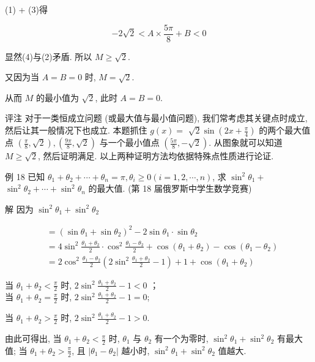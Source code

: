 	(1) + (3)得


	\begin{equation*}
		-2 \sqrt{2}<A \times \frac{5 \pi}{8}+B<0 \tag{4}
	\end{equation*}


	显然(4)与(2)矛盾. 所以 $M \geqslant \sqrt{2}$.

	又因为当 $A=B=0$ 时, $M=\sqrt{2}$.

	从而 $M$ 的最小值为 $\sqrt{2}$, 此时 $A=B=0$.

	评注 对于一类恒成立问题 (或最大值与最小值问题), 我们常考虑其关键点时成立, 然后让其一般情况下也成立. 本题抓住 $g(x)=$ $\sqrt{2} \sin \left(2 x+\frac{\pi}{4}\right)$ 的两个最大值点 $\left(\frac{\pi}{8}, \sqrt{2}\right),\left(\frac{9 \pi}{8}, \sqrt{2}\right)$ 与一个最小值点 $\left(\frac{5 \pi}{8},-\sqrt{2}\right)$. 从图象就可以知道 $M \geqslant \sqrt{2}$, 然后证明满足. 以上两种证明方法均依据特殊点性质进行论证.

	例 18 已知 $\theta_{1}+\theta_{2}+\cdots+\theta_{n}=\pi, \theta_{i} \geqslant 0(i=1,2, \cdots, n)$, 求 $\sin ^{2} \theta_{1}+$ $\sin ^{2} \theta_{2}+\cdots+\sin ^{2} \theta_{n}$ 的最大值. (第 18 届俄罗斯中学生数学竞赛)

	解 因为 $\sin ^{2} \theta_{1}+\sin ^{2} \theta_{2}$

	$$
		\begin{aligned}
			 & =\left(\sin \theta_{1}+\sin \theta_{2}\right)^{2}-2 \sin \theta_{1} \cdot \sin \theta_{2}                                                                                    \\
			 & =4 \sin ^{2} \frac{\theta_{1}+\theta_{2}}{2} \cdot \cos ^{2} \frac{\theta_{1}-\theta_{2}}{2}+\cos \left(\theta_{1}+\theta_{2}\right)-\cos \left(\theta_{1}-\theta_{2}\right) \\
			 & =2 \cos ^{2} \frac{\theta_{1}-\theta_{2}}{2}\left(2 \sin ^{2} \frac{\theta_{1}+\theta_{2}}{2}-1\right)+1+\cos \left(\theta_{1}+\theta_{2}\right)
		\end{aligned}
	$$

	当 $\theta_{1}+\theta_{2}<\frac{\pi}{2}$ 时, $2 \sin ^{2} \frac{\theta_{1}+\theta_{2}}{2}-1<0$ ；\\
	当 $\theta_{1}+\theta_{2}=\frac{\pi}{2}$ 时, $2 \sin ^{2} \frac{\theta_{1}+\theta_{2}}{2}-1=0$;

	当 $\theta_{1}+\theta_{2}>\frac{\pi}{2}$ 时, $2 \sin ^{2} \frac{\theta_{1}+\theta_{2}}{2}-1>0$.

	由此可得出, 当 $\theta_{1}+\theta_{2}<\frac{\pi}{2}$ 时, $\theta_{1}$ 与 $\theta_{2}$ 有一个为零时, $\sin ^{2} \theta_{1}+\sin ^{2} \theta_{2}$ 有最大值; 当 $\theta_{1}+\theta_{2}>\frac{\pi}{2}$, 且 $\left|\theta_{1}-\theta_{2}\right|$ 越小时, $\sin ^{2} \theta_{1}+\sin ^{2} \theta_{2}$ 值越大.

